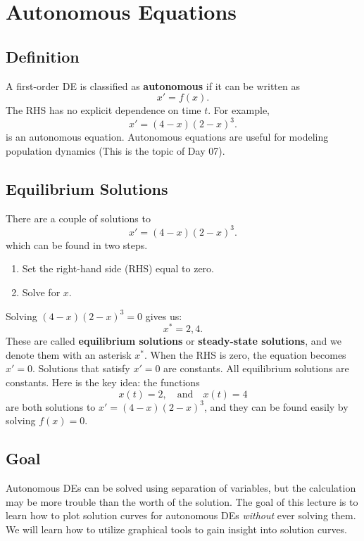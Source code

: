 \documentclass[10pt,letterpaper]{article}
\begin{document}

\section{Autonomous Equations}

\subsection{Definition}
A first-order DE is classified as \textbf{autonomous} if it can be written as
\[
x' = f(x).
\]
The RHS has no explicit dependence on time $t$. For example,
\[
x' = (4-x)(2-x)^3.
\]
is an autonomous equation. Autonomous equations are useful for modeling population dynamics (This is the topic of Day 07). 

\subsection{Equilibrium Solutions}
There are a couple of solutions to 
\[
x' = (4-x)(2-x)^3.
\]
which can be found in two steps. 
\begin{enumerate}
\item Set the right-hand side (RHS) equal to zero.
\item Solve for $x$. 
\end{enumerate}
Solving $(4-x)(2-x)^3=0$ gives us:
$$
x^* = 2,4.
$$
These are called \textbf{equilibrium solutions} or \textbf{steady-state solutions}, and we denote them with an asterisk $x^*$. When the RHS is zero, the equation becomes $x'=0$. Solutions that satisfy $x'=0$ are constants. All equilibrium solutions are constants. Here is the key idea: the functions 
$$
    x(t)=2, \quad \text{and}\quad x(t)=4
$$
are both solutions to $x'=(4-x)(2-x)^3$, and they can be found easily by solving $f(x)=0$.

\subsection{Goal}
Autonomous DEs can be solved using separation of variables, but the calculation may be more trouble than the worth of the solution. The goal of this lecture is to learn how to plot solution curves for autonomous DEs \textit{without} ever solving them. We will learn how to utilize graphical tools to gain insight into solution curves.
\end{document}
